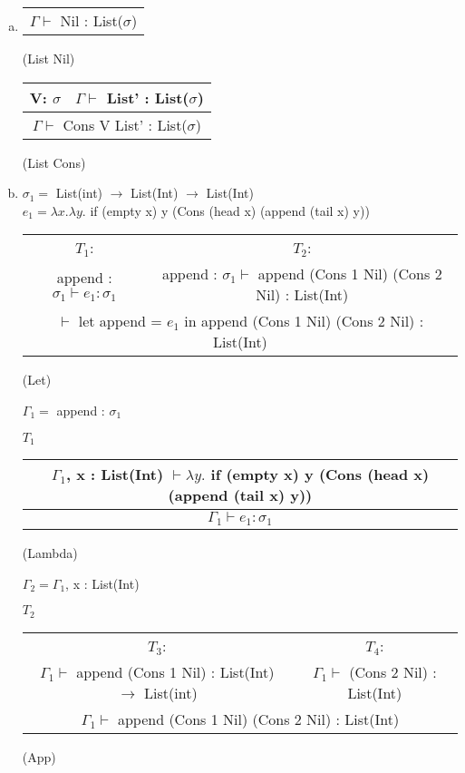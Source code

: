 \documentclass[12pt, a4paper]{article}
\begin{document}
\begin{enumerate}[(a)]
	\begin{tabular}{c}
		List$_1$ $\Downarrow$ Cons V$_1$ List$_1$'
		\\\hline
		append List$_1$ List$_2$ $\Downarrow$ Cons V$_1$ (append List$_1$' List$_2$)
	\end{tabular}
	(append Cons)

	Apparently this was not what we were supposed to do, we were supposed to define a lambda function:

	let append = $\lambda x. \lambda y.$ if (empty x) y (Cons (head x) (append (tail x) y))
	in append (Cons 1 Nil) (Cons 2 Nil)
	\item %
	\begin{tabular}{c}
		\\\hline
		$\Gamma \vdash$ Nil : List($\sigma$)
	\end{tabular}
	(List Nil)

	\begin{tabular}{c c}
		V: $\sigma$ & $\Gamma \vdash$ List' : List($\sigma$)
		\\\hline
		\multicolumn{2}{c}{$\Gamma \vdash$ Cons V List' : List($\sigma$)}
	\end{tabular}
	(List Cons)
	\item %
	$\sigma_1 =$ List(int) $\rightarrow$ List(Int) $\rightarrow$ List(Int)\\
	$e_1 = \lambda x. \lambda y.$ if (empty x) y (Cons (head x) (append (tail x) y))

	\begin{tabular}{c c}
		$T_1$: & $T_2$:\\
		append : $\sigma_1 \vdash e_1 : \sigma_1$ & append : $\sigma_1 \vdash$ append (Cons 1 Nil) (Cons 2 Nil) : List(Int)
		\\\hline
		\multicolumn{2}{c}{$\vdash$ let append = $e_1$ in append (Cons 1 Nil) (Cons 2 Nil) : List(Int)}
	\end{tabular}
	(Let)

	$\Gamma_1 =$ append : $\sigma_1$

	$T_1$
	\begin{tabular}{c}
		$\Gamma_1$, x : List(Int) $\vdash \lambda y.$ if (empty x) y (Cons (head x) (append (tail x) y))
		\\\hline
		$\Gamma_1 \vdash e_1 : \sigma_1$
	\end{tabular}
	(Lambda)

	$\Gamma_2 = \Gamma_1$, x : List(Int)

	$T_2$
	\begin{tabular}{c c}
		$T_3$: & $T_4$:\\
		$\Gamma_1 \vdash$ append (Cons 1 Nil) : List(Int) $\rightarrow$ List(int) & $\Gamma_1 \vdash$ (Cons 2 Nil) : List(Int)
		\\\hline
		\multicolumn{2}{c}{$\Gamma_1 \vdash$ append (Cons 1 Nil) (Cons 2 Nil) : List(Int)}
	\end{tabular}
	(App)


\end{enumerate}
\end{document}
